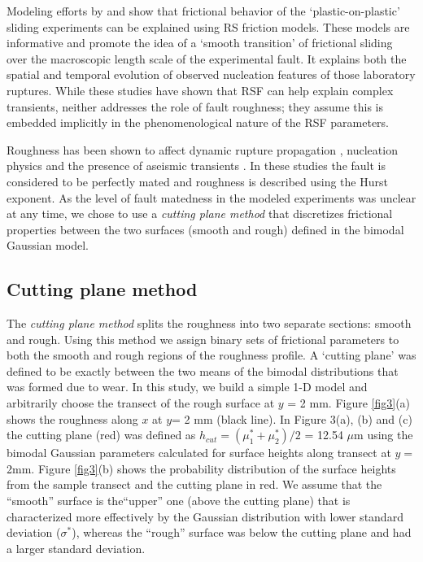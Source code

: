 \documentclass[preprint,1p, 10pt,authoryear]{elsarticle}
\begin{document}
Modeling efforts by \citet{Kaneko2011} and \citet{Kaneko2016} show that frictional behavior of the `plastic-on-plastic' sliding experiments can be explained using RS friction models. These models are informative and promote the idea of a `smooth transition' of frictional sliding over the macroscopic length scale of the experimental fault. It explains both the spatial and temporal evolution of observed nucleation features of those laboratory ruptures. While these studies have shown that RSF can help explain complex transients, neither addresses the role of fault roughness; they assume this is embedded implicitly in the phenomenological nature of the RSF parameters.

Roughness has been shown to affect dynamic rupture propagation \citep[e.g.][]{Dunham2011, Fang2013}, nucleation physics \citep[e.g.][]{Tal2018} and the presence of aseismic transients \citep{Ozawa2019}. In these studies the fault is considered to be perfectly mated and roughness is described using the Hurst exponent. As the level of fault matedness in the modeled experiments was unclear at any time, we chose to use a \textit{cutting plane method} that discretizes frictional properties between the two surfaces (smooth and rough) defined in the bimodal Gaussian model.

\subsection{Cutting plane method}
The \textit{cutting plane method} splits the roughness into two separate sections: smooth and rough. Using this method we assign binary sets of frictional parameters to both the smooth and rough regions of the roughness profile. A `cutting plane' was defined to be exactly between the two means of the bimodal distributions that was formed due to wear. In this study, we build a simple 1-D model and arbitrarily choose the transect of the rough surface at $y$ = 2 mm. Figure \ref{fig3}(a) shows the roughness along $x$ at $y$= 2 mm (black line). In Figure 3(a), (b) and (c) the cutting plane (red) was defined as $h_{cut} = \left(\mu^{*}_{1}+\mu^{*}_{2} \right)/2$ = 12.54 $\mu$m using the bimodal Gaussian parameters calculated for surface heights along transect at $y = $ 2mm. Figure \ref{fig3}(b) shows the probability distribution of the surface heights from the sample transect and the cutting plane in red. We assume that the ``smooth'' surface is the``upper'' one (above the cutting plane) that is characterized more effectively by the Gaussian distribution with lower standard deviation ($\sigma^{*}$), whereas the ``rough'' surface was below the cutting plane and had a larger standard deviation.
\end{document}
